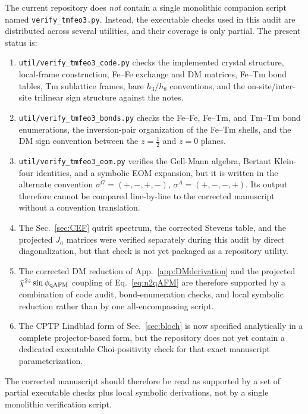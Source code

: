 \documentclass[reprint,amsmath,amssymb,aps,prb,longbibliography]{revtex4-2}
\newcommand{\half}{\tfrac{1}{2}}
\begin{document}
The current repository does \emph{not} contain a single monolithic
companion script named \verb|verify_tmfeo3.py|. Instead, the executable
checks used in this audit are distributed across several utilities, and
their coverage is only partial. The present status is:
\begin{enumerate}[leftmargin=*]
\item \verb|util/verify_tmfeo3_code.py| checks the implemented crystal
  structure, local-frame construction, Fe--Fe exchange and DM matrices,
  Fe--Tm bond tables, Tm sublattice frames, bare $h_3/h_8$ conventions,
  and the on-site/inter-site trilinear sign structure against the notes.
\item \verb|util/verify_tmfeo3_bonds.py| checks the Fe--Fe, Fe--Tm, and
  Tm--Tm bond enumerations, the inversion-pair organization of the
  Fe--Tm shells, and the DM sign convention between the $z=\half$ and
  $z=0$ planes.
\item \verb|util/verify_tmfeo3_eom.py| verifies the Gell-Mann algebra,
  Bertaut Klein-four identities, and a symbolic EOM expansion, but it is
  written in the alternate convention
  $\sigma^G=(+,-,+,-)$, $\sigma^A=(+,-,-,+)$. Its output therefore
  cannot be compared line-by-line to the corrected manuscript without a
  convention translation.
\item The Sec.~\ref{sec:CEF} qutrit spectrum, the corrected Stevens table,
  and the projected $J_a$ matrices were verified separately during this
  audit by direct diagonalization, but that check is not yet packaged as a
  repository utility.
\item The corrected DM reduction of App.~\ref{app:DMderivation} and the
  projected $\bar\chi^{2z}\sin\phi_{\rm qAFM}$ coupling of
  Eq.~\eqref{eq:n2qAFM} are therefore supported by a combination of code
  audit, bond-enumeration checks, and local symbolic reduction rather than
  by one all-encompassing script.
\item The CPTP Lindblad form of Sec.~\ref{sec:bloch} is now specified
  analytically in a complete projector-based form, but the repository does
  not yet contain a dedicated executable Choi-positivity check for that
  exact manuscript parameterization.
\end{enumerate}
The corrected manuscript should therefore be read as supported by a set of
partial executable checks plus local symbolic derivations, not by a single
monolithic verification script.
\end{document}
